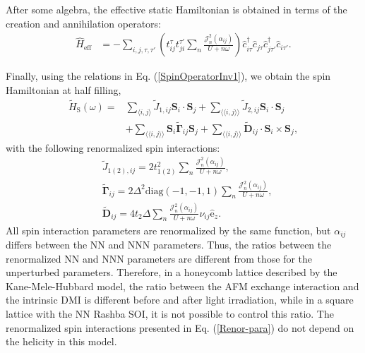 \documentclass[aps,prl,twocolumn,amsmath,amssymb,nobibnotes]{revtex4-1}%
\newcommand{\n}{\nonumber}
\newcommand{\bs}{\boldsymbol}
\begin{document}
After some algebra, the effective static Hamiltonian is obtained in terms of the creation and annihilation operators:
\begin{align}
\hat{H}_{\text{eff}} &= - \sum_{i,j, \tau, \tau'} \left(t_{ij}^{\tau} t_{ji}^{\tau'} \sum_{n} \frac{\mathcal{J}_{n}^2(\alpha_{ij})}{U+n\omega} \right)  \hat{c}_{i \tau}^\dagger \hat{c}_{j \tau} \hat{c}_{j \tau'}^\dagger \hat{c}_{i \tau'}. \label{GeneralHeff}
\end{align}



Finally, using the relations in Eq. (\ref{SpinOperatorInv1}), we obtain the spin Hamiltonian at half filling,
\begin{align}
\label{MKMHeffw}
\tilde{H}_{\text{S}}(\omega) =& \sum_{\langle i,j \rangle} \tilde{J}_{1,ij} \bs{S}_i\cdot\bs{S}_j + \sum_{\langle \langle i,j \rangle \rangle} \tilde{J}_{2,ij}\bs{S}_i\cdot\bs{S}_j \n \\
&+ \sum_{\langle \langle i,j \rangle \rangle} \bs{S}_i \tilde{\bs{\Gamma}}_{ij} \bs{S}_j +\sum_{\langle \langle i,j \rangle \rangle} \tilde{\bs{D}}_{ij}\cdot \bs{S}_i \times \bs{S}_j,
\end{align}
with the following renormalized spin interactions:
\begin{subequations}
\label{Renor-para}
\begin{align}
&\tilde{J}_{1(2),ij} = 2t_{1(2)}^2\sum_n\frac{\mathcal{J}_{n}^2(\alpha_{ij})}{U+n\omega}, \\
&\tilde{\bs{\Gamma}}_{ij} = 2\Delta^2 \text{diag}(-1,-1,1) \sum_n\frac{\mathcal{J}_{n}^2(\alpha_{ij})}{U+n\omega},\\
&\tilde{\bs{D}}_{ij} = 4 t_2 \Delta \sum_n\frac{\mathcal{J}_{n}^2(\alpha_{ij})}{U+n\omega} \nu_{ij} \hat{\mathrm{e}}_z.
\end{align}
\end{subequations}
All spin interaction parameters are renormalized by the same function, but $\alpha_{ij}$ differs between the NN and NNN parameters. Thus, the ratios between the renormalized NN and NNN parameters are different from those for the unperturbed parameters. Therefore, in a honeycomb lattice described by the Kane-Mele-Hubbard model, the ratio between the AFM exchange interaction and the intrinsic DMI is different before and after light irradiation, while in a square lattice with the NN Rashba SOI, it is not possible to control this ratio.
The renormalized spin interactions presented in Eq. (\ref{Renor-para}) do not depend on the helicity in this model.
\end{document}
